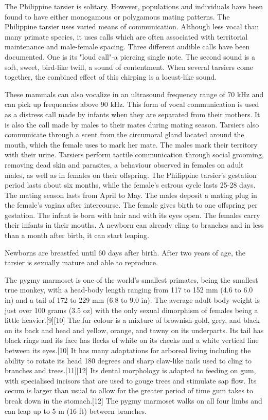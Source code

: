 \documentclass[twoside, 12pt, letterpaper]{report}\usepackage[]{graphicx}\usepackage[]{color}
\begin{document}
\begin{multicols*}{2}
The Philippine tarsier is solitary. However, populations and individuals have been found to have either monogamous or polygamous mating patterns. The Philippine tarsier uses varied means of communication. Although less vocal than many primate species, it uses calls which are often associated with territorial maintenance and male-female spacing. Three different audible calls have been documented. One is its "loud call"-a piercing single note. The second sound is a soft, sweet, bird-like twill, a sound of contentment. When several tarsiers come together, the combined effect of this chirping is a locust-like sound.

These mammals can also vocalize in an ultrasound frequency range of 70 kHz and can pick up frequencies above 90 kHz. This form of vocal communication is used as a distress call made by infants when they are separated from their mothers. It is also the call made by males to their mates during mating season. Tarsiers also communicate through a scent from the circumoral gland located around the mouth, which the female uses to mark her mate. The males mark their territory with their urine. Tarsiers perform tactile communication through social grooming, removing dead skin and parasites, a behaviour observed in females on adult males, as well as in females on their offspring. The Philippine tarsier's gestation period lasts about six months, while the female's estrous cycle lasts 25-28 days. The mating season lasts from April to May. The males deposit a mating plug in the female's vagina after intercourse. The female gives birth to one offspring per gestation. The infant is born with hair and with its eyes open. The females carry their infants in their mouths. A newborn can already cling to branches and in less than a month after birth, it can start leaping.

Newborns are breastfed until 60 days after birth. After two years of age, the tarsier is sexually mature and able to reproduce.

\nsubsection{\marmoset}
The pygmy marmoset is one of the world's smallest primates, being the smallest true monkey, with a head-body length ranging from 117 to 152 mm (4.6 to 6.0 in) and a tail of 172 to 229 mm (6.8 to 9.0 in). The average adult body weight is just over 100 grams (3.5 oz) with the only sexual dimorphism of females being a little heavier.[9][10] The fur colour is a mixture of brownish-gold, grey, and black on its back and head and yellow, orange, and tawny on its underparts. Its tail has black rings and its face has flecks of white on its cheeks and a white vertical line between its eyes.[10] It has many adaptations for arboreal living including the ability to rotate its head 180 degrees and sharp claw-like nails used to cling to branches and trees.[11][12] Its dental morphology is adapted to feeding on gum, with specialised incisors that are used to gouge trees and stimulate sap flow. Its cecum is larger than usual to allow for the greater period of time gum takes to break down in the stomach.[12] The pygmy marmoset walks on all four limbs and can leap up to 5 m (16 ft) between branches.


\end{multicols*}
\end{document}

